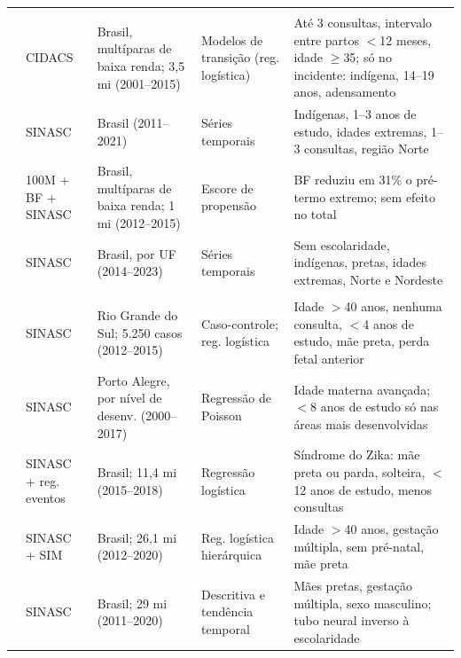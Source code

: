 \begin{table}[H]
\begin{tabularx}{\textwidth}{@{}p{2.3cm} p{1.85cm} p{2.55cm} p{2.35cm} Y@{}}
\addlinespace[3.5pt]
 \\
\cite{rocha2022} & CIDACS & Brasil, multíparas de baixa renda; 3,5 mi (2001--2015) & Modelos de transição (reg. logística) & Até 3 consultas, intervalo entre partos $<$12 meses, idade $\geq$35; só no incidente: indígena, 14--19 anos, adensamento \\
\cite{alberton2023} & SINASC & Brasil (2011--2021) & Séries temporais & Indígenas, 1--3 anos de estudo, idades extremas, 1--3 consultas, região Norte \\
\cite{ortelan2024} & 100M + BF + SINASC & Brasil, multíparas de baixa renda; 1 mi (2012--2015) & Escore de propensão & BF reduziu em 31\% o pré-termo extremo; sem efeito no total \\
\cite{victor2025} & SINASC & Brasil, por UF (2014--2023) & Séries temporais & Sem escolaridade, indígenas, pretas, idades extremas, Norte e Nordeste \\

\addlinespace[3.5pt]
 \\
\cite{trevilato2022} & SINASC & Rio Grande do Sul; 5.250 casos (2012--2015) & Caso-controle; reg. logística & Idade $>$40 anos, nenhuma consulta, $<$4 anos de estudo, mãe preta, perda fetal anterior \\
\cite{anele2022} & SINASC & Porto Alegre, por nível de desenv. (2000--2017) & Regressão de Poisson & Idade materna avançada; $<$8 anos de estudo só nas áreas mais desenvolvidas \\
\cite{paixao2022} & SINASC + reg. eventos & Brasil; 11,4 mi (2015--2018) & Regressão logística & Síndrome do Zika: mãe preta ou parda, solteira, $<$12 anos de estudo, menos consultas \\
\cite{fernandes2025} & SINASC + SIM & Brasil; 26,1 mi (2012--2020) & Reg. logística hierárquica & Idade $>$40 anos, gestação múltipla, sem pré-natal, mãe preta \\
\cite{melkan2025} & SINASC & Brasil; 29 mi (2011--2020) & Descritiva e tendência temporal & Mães pretas, gestação múltipla, sexo masculino; tubo neural inverso à escolaridade \\


\end{tabularx}
\end{table}
